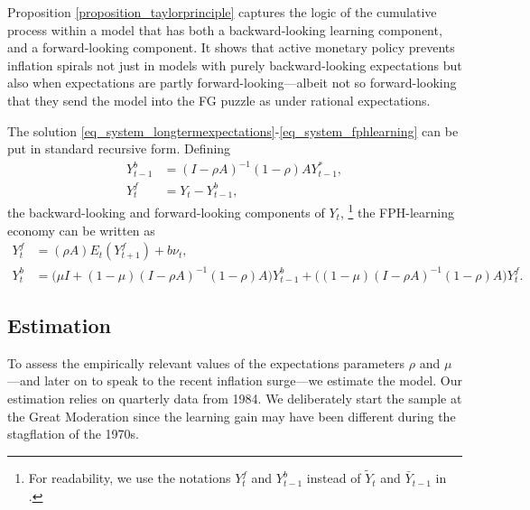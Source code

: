 \documentclass{article}
\begin{document}
Proposition \ref{proposition_taylorprinciple} captures the logic of the cumulative process within a model that has both a backward-looking learning component, and a forward-looking component. It shows that active monetary policy prevents inflation spirals not just in models with purely backward-looking expectations but also when expectations are partly forward-looking---albeit not so forward-looking that they send the model into the FG puzzle as under rational expectations.

The solution \eqref{eq_system_longtermexpectations}-\eqref{eq_system_fphlearning} can be put in standard recursive form. Defining
\begin{align}
Y^b_{t-1} &=(I-\rho A)^{-1}(1-\rho)A Y_{t-1}^*,\label{eq_defYb}\\
Y^f_t &= Y_t - Y^b_{t-1} \label{eq_defYf},
\end{align}
the backward-looking and forward-looking components of $Y_t$, \footnote{For readability, we use the notations $Y^f_t$ and $Y^b_{t-1}$ instead of $\tilde{Y}_t$ and $\bar{Y}_{t-1}$ in \cite{Woodford2019}.} the FPH-learning economy can be written as
\begin{align}
Y^f_t &= (\rho A) E_t(Y^f_{t+1}) + b \nu_t,\label{eq_system1}\\
Y^b_t &= \bigg(\mu I + (1-\mu) (I-\rho A)^{-1}(1-\rho)A\bigg) Y^b_{t-1} + \bigg((1-\mu) (I-\rho A)^{-1}(1-\rho)A\bigg) Y^f_t.\label{eq_system2}
\end{align}

\subsection{Estimation}\label{sec_estimation}
To assess the empirically relevant values of the expectations parameters $\rho$ and $\mu$---and later on to speak to the recent inflation surge---we estimate the model. Our estimation relies on quarterly data from 1984. We deliberately start the sample at the Great Moderation since the learning gain may have been different during the stagflation of the 1970s.
\end{document}
